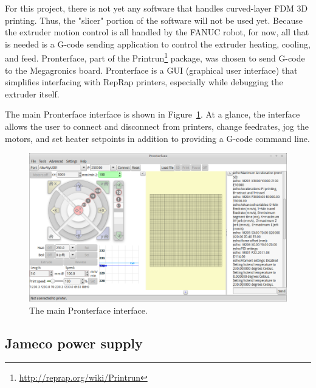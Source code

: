 For this project, there is not yet any software that handles curved-layer FDM 3D printing. Thus, the "slicer" portion of the software will not be used yet. Because the extruder motion control is all handled by the FANUC robot, for now, all that is needed is a G-code sending application to control the extruder heating, cooling, and feed. Pronterface, part of the Printrun\footnote{\url{http://reprap.org/wiki/Printrun}} package, was chosen to send G-code to the Megagronics board. Pronterface is a GUI (graphical user interface) that simplifies interfacing with RepRap printers, especially while debugging the extruder itself. 

The main Pronterface interface is shown in Figure~\ref{fig:pronterface}. At a glance, the interface allows the user to connect and disconnect from printers, change feedrates, jog the motors, and set heater setpoints in addition to providing a G-code command line.

\begin{figure}
    \centering
    \includegraphics[width=.9\linewidth]{figures/pronterface}
    \caption{The main Pronterface interface.}
    \label{fig:pronterface}
\end{figure}

\subsection{Jameco power supply}
